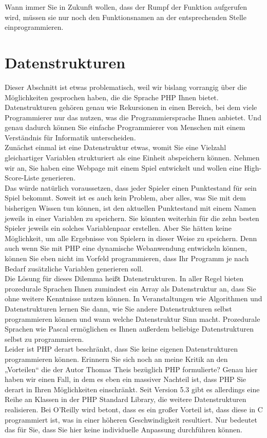 Wann immer Sie in Zukunft wollen, dass der Rumpf der Funktion aufgerufen wird, müssen sie nur noch den Funktionsnamen an der entsprechenden Stelle einprogrammieren.

\section{Datenstrukturen}

Dieser Abschnitt ist etwas problematisch, weil wir bislang vorrangig über die Möglichkeiten gesprochen haben, die die Sprache PHP Ihnen bietet. Datenstrukturen gehören genau wie Rekursionen in einen Bereich, bei dem viele Programmierer nur das nutzen, was die Programmiersprache Ihnen anbietet. Und genau dadurch können Sie einfache Programmierer von Menschen mit einem Verständnis für Informatik unterscheiden.\\

Zunächst einmal ist eine Datenstruktur etwas, womit Sie eine Vielzahl gleichartiger Variablen strukturiert als eine Einheit abspeichern können. Nehmen wir an, Sie haben eine Webpage mit einem Spiel entwickelt und wollen eine High-Score-Liste generieren.\\

Das würde natürlich voraussetzen, dass jeder Spieler einen Punktestand für sein Spiel bekommt. Soweit ist es auch kein Problem, aber alles, was Sie mit dem bisherigen Wissen tun können, ist den aktuellen Punktestand mit einem Namen jeweils in einer Variablen zu speichern. Sie könnten weiterhin für die zehn besten Spieler jeweils ein solches Variablenpaar erstellen. Aber Sie hätten keine Möglichkeit, um alle Ergebnisse von Spielern in dieser Weise zu speichern. Denn auch wenn Sie mit PHP eine dynamische Webanwendung entwickeln können, können Sie eben nicht im Vorfeld programmieren, dass Ihr Programm je nach Bedarf zusätzliche Variablen generieren soll.\\

Die Lösung für dieses Dilemma heißt Datenstrukturen. In aller Regel bieten prozedurale Sprachen Ihnen zumindest ein Array als Datenstruktur an, dass Sie ohne weitere Kenntnisse nutzen können. In Veranstaltungen wie Algorithmen und Datenstrukturen lernen Sie dann, wie Sie andere Datenstrukturen selbst programmieren können und wann welche Datenstruktur Sinn macht. Prozedurale Sprachen wie Pascal ermöglichen es Ihnen außerdem beliebige Datenstrukturen selbst zu programmieren.\\

Leider ist PHP derart beschränkt, dass Sie keine eigenen Datenstrukturen programmieren können. Erinnern Sie sich noch an meine Kritik an den „Vorteilen“ die der Autor Thomas Theis bezüglich PHP formulierte? Genau hier haben wir einen Fall, in dem es eben ein massiver Nachteil ist, dass PHP Sie derart in Ihren Möglichkeiten einschränkt. Seit Version 5.3 gibt es allerdings eine Reihe an Klassen in der PHP Standard Library, die weitere Datenstrukturen realisieren. Bei O’Reilly wird betont, dass es ein großer Vorteil ist, dass diese in C programmiert ist, was in einer höheren Geschwindigkeit resultiert. Nur bedeutet das für Sie, dass Sie hier keine individuelle Anpassung durchführen können.\\


